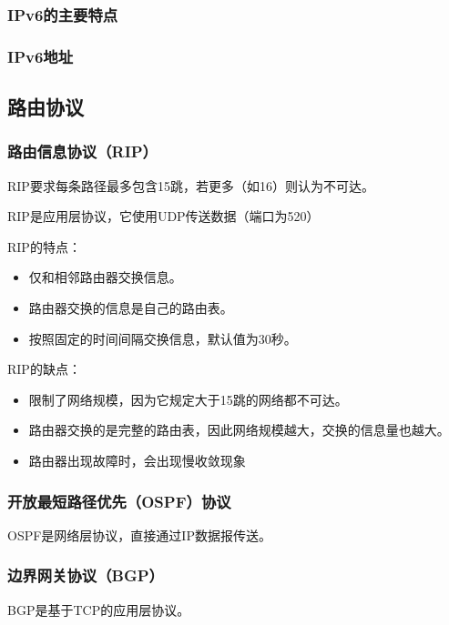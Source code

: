 \documentclass[12pt, a4paper, oneside]{ctexart}
\begin{document}
\subsubsection{IPv6的主要特点}

\subsubsection{IPv6地址}

\subsection{路由协议}

\subsubsection{路由信息协议（RIP）}

RIP要求每条路径最多包含15跳，若更多（如16）则认为不可达。

RIP是应用层协议，它使用UDP传送数据（端口为520）

RIP的特点：
\begin{itemize}
    \item 仅和相邻路由器交换信息。
    \item 路由器交换的信息是自己的路由表。
    \item 按照固定的时间间隔交换信息，默认值为30秒。
\end{itemize}

RIP的缺点：
\begin{itemize}
    \item 限制了网络规模，因为它规定大于15跳的网络都不可达。
    \item 路由器交换的是完整的路由表，因此网络规模越大，交换的信息量也越大。
    \item 路由器出现故障时，会出现慢收敛现象
\end{itemize}

\subsubsection{开放最短路径优先（OSPF）协议}

OSPF是网络层协议，直接通过IP数据报传送。

\subsubsection{边界网关协议（BGP）}

BGP是基于TCP的应用层协议。
\end{document}
